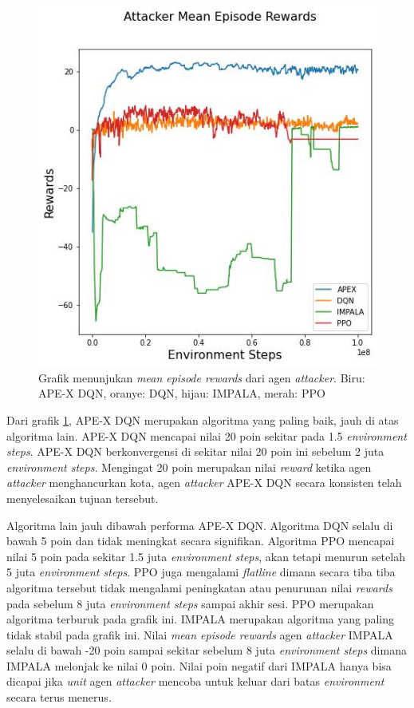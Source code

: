\begin{figure}[H]
  \centering
    \includegraphics[scale=0.9]{gambar/attacker_reward_mean.jpg}
    \caption{Grafik menunjukan \emph{mean episode rewards} dari agen \emph{attacker}.
    Biru: APE-X DQN, oranye: DQN, hijau: IMPALA, merah: PPO}
    \label{fig:attackerMeanEpisodeGraph}
\end{figure}

Dari grafik \ref{fig:attackerMeanEpisodeGraph}, APE-X DQN merupakan algoritma yang paling baik,
jauh di atas algoritma lain. APE-X DQN mencapai nilai 20 poin sekitar pada 1.5 \emph{environment steps}.
APE-X DQN berkonvergensi di sekitar nilai 20 poin ini sebelum 2 juta \emph{environment steps}.
Mengingat 20 poin merupakan nilai \emph{reward} ketika agen \emph{attacker} menghancurkan kota,
agen \emph{attacker} APE-X DQN secara konsisten telah menyelesaikan tujuan tersebut.

Algoritma lain jauh dibawah performa APE-X DQN. Algoritma DQN selalu di bawah 5 poin dan tidak meningkat secara signifikan.
Algoritma PPO mencapai nilai 5 poin pada sekitar 1.5 juta \emph{environment steps}, akan tetapi menurun setelah 5 juta
\emph{environment steps}. PPO juga mengalami \emph{flatline} dimana secara tiba tiba algoritma tersebut
tidak mengalami peningkatan atau penurunan nilai \emph{rewards} pada sebelum 8 juta \emph{environment steps}
sampai akhir sesi. PPO merupakan algoritma terburuk pada grafik ini. IMPALA merupakan algoritma yang paling tidak stabil pada grafik ini.
Nilai \emph{mean episode rewards} agen \emph{attacker} IMPALA selalu di bawah -20 poin sampai
sekitar sebelum 8 juta \emph{environment steps} dimana IMPALA melonjak ke nilai 0 poin.
Nilai poin negatif dari IMPALA hanya bisa dicapai jika \emph{unit} agen \emph{attacker} mencoba untuk keluar
dari batas \emph{environment} secara terus menerus.


